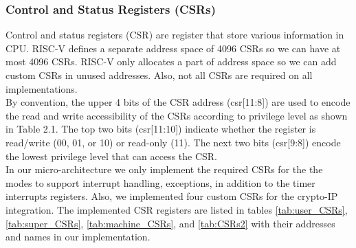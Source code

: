 \documentclass[../main.tex]{subfiles}
\begin{document}
\subsubsection{Control and Status Registers (CSRs)}
Control and status registers (CSR) are register that store various information in CPU. RISC-V defines a separate address space of 4096 CSRs so we can have at most 4096 CSRs. RISC-V only allocates a part of address space so we can add custom CSRs in unused addresses. Also, not all CSRs are required on all implementations.\\By convention, the upper 4 bits of the CSR address (csr[11:8]) are used to encode the read and write accessibility of the CSRs according to privilege level as shown in Table 2.1. The top two bits (csr[11:10]) indicate whether the register is read/write (00, 01, or 10) or read-only (11). The next two bits (csr[9:8]) encode the lowest privilege level that can access the CSR.\\ 
\newline
\noindent In our micro-architecture we only implement the required CSRs for the the modes to support interrupt handling, exceptions, in addition to the timer interrupts registers. Also, we implemented four custom CSRs for the crypto-IP integration.
The implemented CSR registers are listed in tables \ref{tab:user_CSRs},  \ref{tab:super_CSRs}, \ref{tab:machine_CSRs}, and \ref{tab:CSRs2} with their addresses and names in our implementation.
\end{document}
